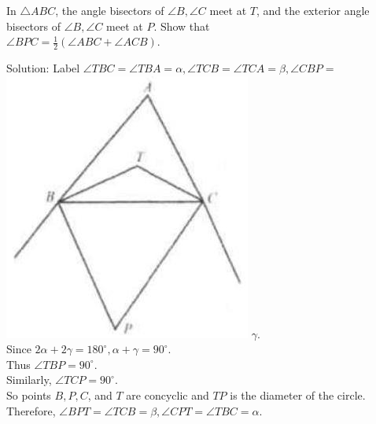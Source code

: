 \documentclass{article}
\begin{document}
In \(\triangle A B C\), the angle bisectors of \(\angle B, \angle C\) meet at \(T\), and the exterior angle bisectors of \(\angle B, \angle C\) meet at \(P\). Show that\\
\(\angle B P C=\frac{1}{2}(\angle A B C+\angle A C B)\).

Solution:
Label \(\angle T B C=\angle T B A=\alpha, \angle T C B=\angle T C A=\beta, \angle C B P=\)\\
\includegraphics[width=\textwidth]{images/195.jpg} \(\gamma\).\\
Since \(2 \alpha+2 \gamma=180^{\circ}, \alpha+\gamma=90^{\circ}\).\\
Thus \(\angle T B P=90^{\circ}\).\\
Similarly, \(\angle T C P=90^{\circ}\).\\
So points \(B, P, C\), and \(T\) are concyclic and \(T P\) is the diameter of the circle.\\
Therefore, \(\angle B P T=\angle T C B=\beta, \angle C P T=\angle T B C=\alpha\).\\
\centering
\end{document}
